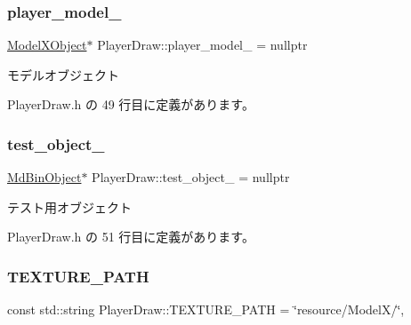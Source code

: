 \subsubsection{\texorpdfstring{player\+\_\+model\+\_\+}{player\_model\_}}
{\footnotesize\ttfamily \mbox{\hyperlink{class_model_x_object}{Model\+X\+Object}}$\ast$ Player\+Draw\+::player\+\_\+model\+\_\+ = nullptr\hspace{0.3cm}{\ttfamily [private]}}



モデルオブジェクト 



 Player\+Draw.\+h の 49 行目に定義があります。

\mbox{\label{class_player_draw_a0f426ae7d3d5b8699acafe4a332f4d58}} 
\subsubsection{\texorpdfstring{test\+\_\+object\+\_\+}{test\_object\_}}
{\footnotesize\ttfamily \mbox{\hyperlink{class_md_bin_object}{Md\+Bin\+Object}}$\ast$ Player\+Draw\+::test\+\_\+object\+\_\+ = nullptr\hspace{0.3cm}{\ttfamily [private]}}



テスト用オブジェクト 



 Player\+Draw.\+h の 51 行目に定義があります。

\mbox{\label{class_player_draw_a808cb174528d55fb35a35b161e262e16}} 
\subsubsection{\texorpdfstring{T\+E\+X\+T\+U\+R\+E\+\_\+\+P\+A\+TH}{TEXTURE\_PATH}}
{\footnotesize\ttfamily const std\+::string Player\+Draw\+::\+T\+E\+X\+T\+U\+R\+E\+\_\+\+P\+A\+TH = \char`\"{}resource/ModelX/\char`\"{}\hspace{0.3cm}{\ttfamily [static]}, {\ttfamily [private]}}



